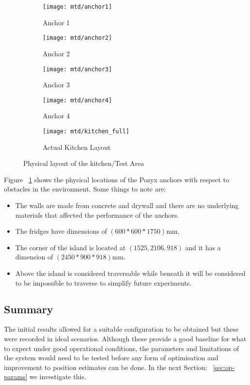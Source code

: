 \begin{figure}[h!]
    \centering
    \begin{subfigure}[b]{0.4\textwidth}
            \texttt{[image: mtd/anchor1]}
            \caption{Anchor 1}
    \end{subfigure}
    \begin{subfigure}[b]{0.4\textwidth}
            \texttt{[image: mtd/anchor2]}
            \caption{Anchor 2}
    \end{subfigure}

    \begin{subfigure}[b]{0.4\textwidth}
            \texttt{[image: mtd/anchor3]}
            \caption{Anchor 3}
    \end{subfigure}
    \begin{subfigure}[b]{0.4\textwidth}
            \texttt{[image: mtd/anchor4]}
            \caption{Anchor 4}
    \end{subfigure}

    \begin{subfigure}[b]{0.7\textwidth}
            \texttt{[image: mtd/kitchen\_full]}
            \caption{Actual Kitchen Layout}
    \end{subfigure}
    \caption{Physical layout of the kitchen/Test Area}
    \label{fig:kitchen}
\end{figure}
\medskip
Figure ~\ref{fig:kitchen} shows the physical locations of the Pozyx anchors with respect to obstacles in the environment.
Some things to note are:
\begin{itemize}
    \item The walls are made from concrete and drywall and there are no underlying materials that affected the performance of the anchors.
    \item The fridges have dimensions of $(600*600*1750)$mm.
    \item The corner of the island is located at $(1525,2106,918)$ and it has a dimension of $(2450*900*918)$mm.
    \item Above the island is considered traversable while beneath it will be considered to be impossible to traverse to simplify future experiments.
\end{itemize}

\subsection*{Summary}
The initial results allowed for a suitable configuration to be obtained but these were recorded in ideal scenarios.
Although these provide a good baseline for what to expect under good operational conditions, the parameters and limitations of the system would need to be tested before any form of optimisation
and improvement to position estimates can be done.
In the next Section: ~\ref{sec:op-params} we investigate this.

\newpage

\newpage
